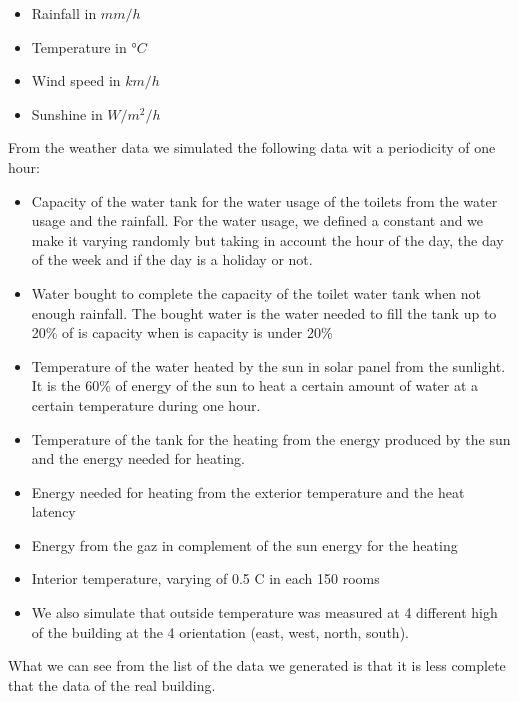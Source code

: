 \documentclass{acm_proc_article-sp}
\begin{document}
\begin{itemize}
\item Rainfall in \(mm/h\)
\item Temperature in \(°C\)
\item Wind speed in \(km/h\)
\item Sunshine in \(W/m^2/h\)
\end{itemize}

From the weather data we simulated the following data wit a periodicity of one hour:

\begin{itemize}
\item Capacity of the water tank for the water usage of the toilets from the water usage and the rainfall. For the water usage, we defined a constant and we make it varying randomly but taking in account the hour of the day, the day of the week and if the day is a holiday or not.
\item Water bought to complete the capacity of the toilet water tank when not enough rainfall. The bought water is the water needed to fill the tank up to 20\% of is capacity when is capacity is under 20\%
 \item Temperature of the water heated by the sun in solar panel from the sunlight. It is the 60\% of energy of the sun to heat a certain amount of water at a certain temperature during one hour.
\item Temperature of the tank for the heating from the energy produced by the sun and the energy needed for heating.
\item Energy needed for heating from the exterior temperature and the heat latency
\item Energy from the gaz in complement of the sun energy for the heating
\item Interior temperature, varying of 0.5 \degree C in each 150 rooms
\item We also simulate that outside temperature was measured at 4 different high of the building at the 4 orientation (east, west, north, south).
\end{itemize}

What we can see from the list of the data we generated is that it is less complete that the data of the real building.
\end{document}
